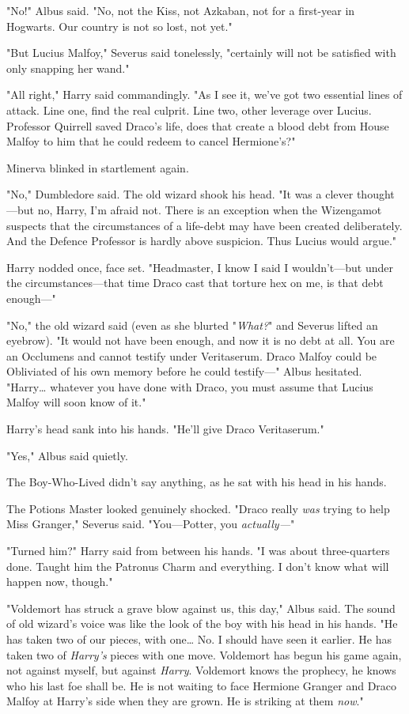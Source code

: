 "No!" Albus said. "No, not the Kiss, not Azkaban, not for a first-year in
Hogwarts. Our country is not so lost, not yet."

"But Lucius Malfoy," Severus said tonelessly, "certainly will not be satisfied
with only snapping her wand."

"All right," Harry said commandingly. "As I see it, we've got two essential
lines of attack. Line one, find the real culprit. Line two, other leverage over
Lucius. Professor Quirrell saved Draco's life, does that create a blood debt
from House Malfoy to him that he could redeem to cancel Hermione's?"

Minerva blinked in startlement again.

"No," Dumbledore said. The old wizard shook his head. "It was a clever
thought---but no, Harry, I'm afraid not. There is an exception when the
Wizengamot suspects that the circumstances of a life-debt may have been created
deliberately. And the Defence Professor is hardly above suspicion. Thus Lucius
would argue."

Harry nodded once, face set. "Headmaster, I know I said I wouldn't---but under
the circumstances---that time Draco cast that torture hex on me, is that debt
enough---"

"No," the old wizard said (even as she blurted "\emph{What?}" and Severus
lifted an eyebrow). "It would not have been enough, and now it is no debt at
all. You are an Occlumens and cannot testify under Veritaserum. Draco Malfoy
could be Obliviated of his own memory before he could testify---" Albus
hesitated. "Harry{\ldots} whatever you have done with Draco, you must assume
that Lucius Malfoy will soon know of it."

Harry's head sank into his hands. "He'll give Draco Veritaserum."

"Yes," Albus said quietly.

The Boy-Who-Lived didn't say anything, as he sat with his head in his hands.

The Potions Master looked genuinely shocked. "Draco really \emph{was} trying to
help Miss Granger," Severus said. "You---Potter, you \emph{actually---}"

"Turned him?" Harry said from between his hands. "I was about three-quarters
done. Taught him the Patronus Charm and everything. I don't know what will
happen now, though."

"Voldemort has struck a grave blow against us, this day," Albus said. The sound
of old wizard's voice was like the look of the boy with his head in his hands.
"He has taken two of our pieces, with one{\ldots} No. I should have seen it
earlier. He has taken two of \emph{Harry's} pieces with one move. Voldemort has
begun his game again, not against myself, but against \emph{Harry}. Voldemort
knows the prophecy, he knows who his last foe shall be. He is not waiting to
face Hermione Granger and Draco Malfoy at Harry's side when they are grown. He
is striking at them \emph{now}."

